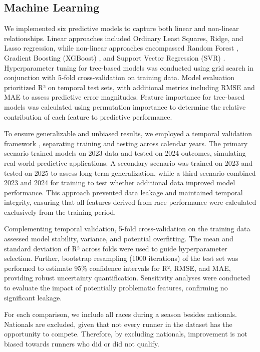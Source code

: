 \documentclass[suppldata]{interact}
\theoremstyle{plain}%
\theoremstyle{definition}
\theoremstyle{remark}
\begin{document}
\subsection{Machine Learning}
We implemented six predictive models to capture both linear and non-linear relationships. Linear approaches included Ordinary Least Squares, Ridge, and Lasso regression, while non-linear approaches encompassed Random Forest \cite{rigatti2017random}, Gradient Boosting (XGBoost) \cite{chen2015xgboost}, and Support Vector Regression (SVR) \cite{awad2015support}. Hyperparameter tuning for tree-based models was conducted using grid search in conjunction with 5-fold cross-validation on training data. Model evaluation prioritized R² on temporal test sets, with additional metrics including RMSE and MAE \cite{willmott2005advantages} to assess predictive error magnitudes. Feature importance for tree-based models was calculated using permutation importance to determine the relative contribution of each feature to predictive performance.

To ensure generalizable and unbiased results, we employed a temporal validation framework \cite{roberts2017cross}, separating training and testing across calendar years. The primary scenario trained models on 2023 data and tested on 2024 outcomes, simulating real-world predictive applications. A secondary scenario was trained on 2023 and tested on 2025 to assess long-term generalization, while a third scenario combined 2023 and 2024 for training to test whether additional data improved model performance. This approach prevented data leakage and maintained temporal integrity, ensuring that all features derived from race performance were calculated exclusively from the training period.

Complementing temporal validation, 5-fold cross-validation on the training data assessed model stability, variance, and potential overfitting. The mean and standard deviation of R² across folds were used to guide hyperparameter selection. Further, bootstrap resampling (1000 iterations) of the test set was performed to estimate 95\% confidence intervals for R², RMSE, and MAE, providing robust uncertainty quantification. Sensitivity analyses were conducted to evaluate the impact of potentially problematic features, confirming no significant leakage.

For each comparison, we include all races during a season besides nationals. Nationals are excluded, given that not every runner in the dataset has the opportunity to compete. Therefore, by excluding nationals, improvement is not biased towards runners who did or did not qualify.
\end{document}
